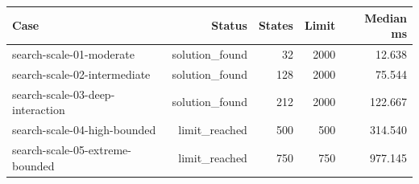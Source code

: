 \begin{tabularx}{\columnwidth}{lrrrr}
\hline
Case & Status & States & Limit & Median ms \\
\hline
search-scale-01-moderate & solution\_found & 32 & 2000 & 12.638 \\
search-scale-02-intermediate & solution\_found & 128 & 2000 & 75.544 \\
search-scale-03-deep-interaction & solution\_found & 212 & 2000 & 122.667 \\
search-scale-04-high-bounded & limit\_reached & 500 & 500 & 314.540 \\
search-scale-05-extreme-bounded & limit\_reached & 750 & 750 & 977.145 \\
\hline
\end{tabularx}
